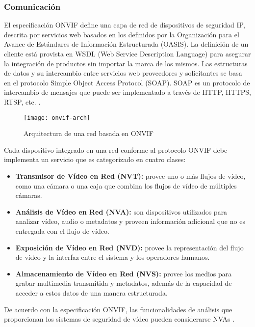 \subsubsection{Comunicación}
El especificación ONVIF define una capa de red de dispositivos de seguridad IP, descrita por servicios web basados en los definidos por la Organización para el Avance de Estándares de Información Estructurada (OASIS). La definición de un cliente está provista en WSDL (Web Service Description Language) para asegurar la integración de productos sin importar la marca de los mismos. Las estructuras de datos y su intercambio entre servicios web proveedores y solicitantes se basa en el protocolo Simple Object Access Protocol (SOAP). SOAP es un protocolo de intercambio de mensajes que puede ser implementado a través de HTTP, HTTPS, RTSP, etc. \cite{Onvif2016-dc}.

    \begin{figure}[H]
        \centering
        \texttt{[image: onvif-arch]}
        \caption{Arquitectura de una red basada en ONVIF \protect\cite{Senst2011-bb}}
        \label{fig:onvif-arch}
    \end{figure}
    
Cada dispositivo integrado en una red conforme al protocolo ONVIF debe implementa un servicio que es categorizado en cuatro clases:

\begin{itemize}
\item \textbf{Transmisor de Vídeo en Red (NVT):} provee uno o más flujos de vídeo, como una cámara o una caja que combina los flujos de vídeo de múltiples cámaras.
\item \textbf{Análisis de Vídeo en Red (NVA):} son dispositivos utilizados para analizar vídeo, audio o metadatos y proveen información adicional que no es entregada con el flujo de vídeo. 
\item \textbf{Exposición de Vídeo en Red (NVD): }provee la representación del flujo de vídeo y la interfaz entre el sistema y los operadores humanos.
\item \textbf{Almacenamiento de Vídeo en Red (NVS):} provee los medios para grabar multimedia transmitida y metadatos, además de la capacidad de acceder a estos datos de una manera estructurada.
\end{itemize}

De acuerdo con la especificación ONVIF, las funcionalidades de análisis que proporcionan los sistemas de seguridad de vídeo pueden considerarse NVAs \cite{Senst2011-bb}.


